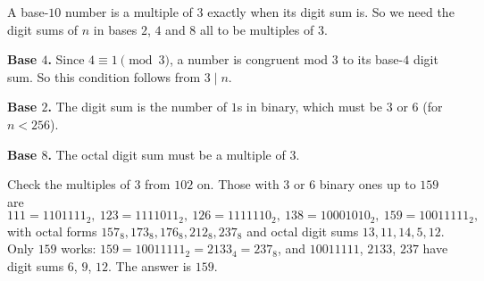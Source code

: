 A base-$10$ number is a multiple of $3$ exactly when its digit sum is. So we need the digit sums of $n$ in bases $2$, $4$ and $8$ all to be multiples of $3$.

\textbf{Base $4$.} Since $4\equiv1\pmod3$, a number is congruent mod $3$ to its base-$4$ digit sum. So this condition follows from $3\mid n$.

\textbf{Base $2$.} The digit sum is the number of $1$s in binary, which must be $3$ or $6$ (for $n<256$).

\textbf{Base $8$.} The octal digit sum must be a multiple of $3$.

Check the multiples of $3$ from $102$ on. Those with $3$ or $6$ binary ones up to $159$ are
\[
111=1101111_2,\ 123=1111011_2,\ 126=1111110_2,\ 138=10001010_2,\ 159=10011111_2,
\]
with octal forms $157_8, 173_8, 176_8, 212_8, 237_8$ and octal digit sums $13,11,14,5,12$. Only $159$ works: $159=10011111_2=2133_4=237_8$, and $10011111$, $2133$, $237$ have digit sums $6$, $9$, $12$. The answer is $\boxed{159}$.
